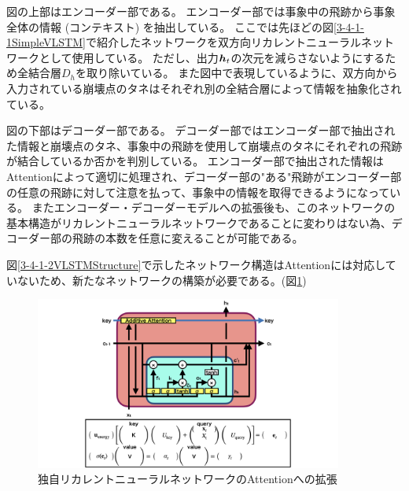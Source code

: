 図の上部はエンコーダー部である。
エンコーダー部では事象中の飛跡から事象全体の情報 (コンテキスト) を抽出している。
ここでは先ほどの図\ref{3-4-1-1SimpleVLSTM}で紹介したネットワークを双方向リカレントニューラルネットワークとして使用している。
ただし、出力${\mbox{\boldmath{$h$}}}_{t}$の次元を減らさないようにするため全結合層$D_h$を取り除いている。
また図中で表現しているように、双方向から入力されている崩壊点のタネはそれぞれ別の全結合層によって情報を抽象化されている。

図の下部はデコーダー部である。
デコーダー部ではエンコーダー部で抽出された情報と崩壊点のタネ、事象中の飛跡を使用して崩壊点のタネにそれぞれの飛跡が結合しているか否かを判別している。
エンコーダー部で抽出された情報はAttentionによって適切に処理され、デコーダー部の"ある"飛跡がエンコーダー部の任意の飛跡に対して注意を払って、事象中の情報を取得できるようになっている。
またエンコーダー・デコーダーモデルへの拡張後も、このネットワークの基本構造がリカレントニューラルネットワークであることに変わりはない為、デコーダー部の飛跡の本数を任意に変えることが可能である。

図\ref{3-4-1-2VLSTMStructure}で示したネットワーク構造はAttentionには対応していないため、新たなネットワークの構築が必要である。(図\ref{3-4-1-5AttentionVLSTM})

\begin{figure}[htbp]
 \centering
 \includegraphics[trim = 100 0 100 0, width=0.9\textwidth, clip]{Figure/3Networks/3-4-1-5AttentionVLSTM.png}
 \caption{独自リカレントニューラルネットワークのAttentionへの拡張}
 \label{3-4-1-5AttentionVLSTM}
\end{figure}

